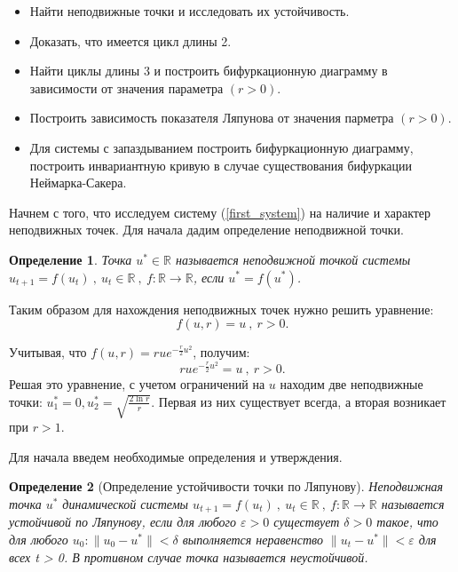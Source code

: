 \documentclass[10pt]{article}
\newtheorem{definition}{Определение}
\numberwithin{equation}{section}
\begin{document}
\begin{itemize}
	\item Найти неподвижные точки и исследовать их устойчивость.
	\item Доказать, что имеется цикл длины 2.
	\item Найти циклы длины 3 и построить бифуркационную диаграмму в зависимости от значения параметра \( (r > 0) \).
	\item Построить зависимость показателя Ляпунова от значения парметра \( (r > 0) \).
	\item Для системы с запаздыванием построить бифуркационную диаграмму, построить инвариантную кривую в случае существования бифуркации Неймарка-Сакера.
\end{itemize}

Начнем с того, что исследуем систему (\ref{first_system}) на наличие и характер неподвижных точек.
Для начала дадим определение неподвижной точки.
\begin{definition}
	Точка \(u^* \in \mathbb{R} \) называется неподвижной точкой системы \( u_{t+1} = f(u_t) \ , \ u_t \in \mathbb{R} \ , \ f : \mathbb{R} \to \mathbb{R}\),  если \( u^* = f(u^*) \).
\end{definition}

\noindent Таким образом для нахождения неподвижных точек нужно решить уравнение:
\[ f(u,r) = u \ , \ r > 0. \]

\noindent Учитывая, что \( f(u,r) = rue^{-\frac{r}{2}u^2}\), получим:
\[ rue^{-\frac{r}{2}u^2} = u \ , \ r > 0. \]
Решая это уравнение, с учетом ограничений на \( u \) находим две неподвижные точки: \( u_1^* = 0, u_2^* = \sqrt{\frac{2\ln{r}}{r}} \). Первая из них существует всегда, а вторая возникает при \( r > 1\).

Для начала введем необходимые определения и утверждения.

\begin{definition}[Определение устойчивости точки по Ляпунову]
	Неподвижная точка \(u^*\) динамической системы \( u_{t+1} = f(u_t) \ , \ u_t \in \mathbb{R} \ , \ f : \mathbb{R} \to \mathbb{R} \) называется устойчивой по Ляпунову, если для любого \( \varepsilon > 0 \) существует \( \delta > 0 \) такое, что для любого \( u_0 : \|u_0 - u^*\| < \delta \) выполняется неравенство  \( \|u_t - u^*\| < \varepsilon \) для всех t > 0. В противном случае точка называется неустойчивой. 
\end{definition}
\end{document}

